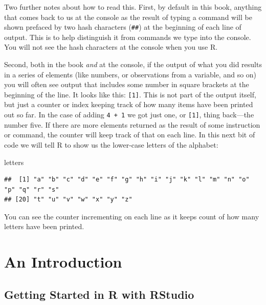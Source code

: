 \documentclass[
]{book}
\newenvironment{Shaded}{\begin{snugshade}}{\end{snugshade}}
\newcommand{\NormalTok}[1]{#1}
\begin{document}
Two further notes about how to read this. First, by default in this book, anything that comes back to us at the console as the result of typing a command will be shown prefaced by two hash characters (\texttt{\#\#}) at the beginning of each line of output. This is to help distinguish it from commands we type into the console. You will not see the hash characters at the console when you use R.

Second, both in the book \emph{and} at the console, if the output of what you did results in a series of elements (like numbers, or observations from a variable, and so on) you will often see output that includes some number in square brackets at the beginning of the line. It looks like this: \texttt{{[}1{]}}. This is not part of the output itself, but just a counter or index keeping track of how many items have been printed out so far. In the case of adding \texttt{4\ +\ 1} we got just one, or \texttt{{[}1{]}}, thing back---the number five. If there are more elements returned as the result of some instruction or command, the counter will keep track of that on each line. In this next bit of code we will tell R to show us the lower-case letters of the alphabet:

\begin{Shaded}
\begin{Highlighting}[]
\NormalTok{letters}
\end{Highlighting}
\end{Shaded}

\begin{verbatim}
##  [1] "a" "b" "c" "d" "e" "f" "g" "h" "i" "j" "k" "l" "m" "n" "o" "p" "q" "r" "s"
## [20] "t" "u" "v" "w" "x" "y" "z"
\end{verbatim}

You can see the counter incrementing on each line as it keeps count of how many letters have been printed.

\hypertarget{an-introduction}{%
\chapter{An Introduction}\label{an-introduction}}

\hypertarget{getting-started-in-r-with-rstudio}{%
\section*{Getting Started in R with RStudio}\label{getting-started-in-r-with-rstudio}}
\end{document}
